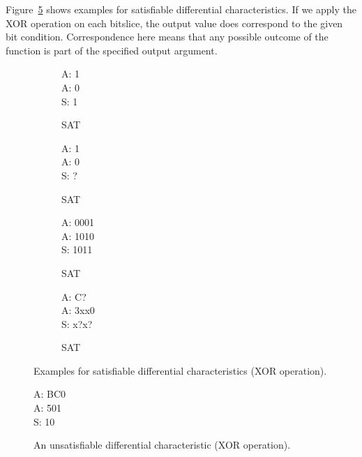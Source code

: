 Figure~\ref{dc:xor-examples} shows examples for satisfiable differential characteristics. If we apply the XOR operation on each bitslice, the output value does correspond to the given bit condition. Correspondence here means that any possible outcome of the function is part of the specified output argument.
%
\begin{figure}[b]
  \begin{center}
    \begin{subfigure}[b]{0.23\textwidth}
      \begin{diffchar}
        A: 1 \\
        A: 0 \\
        S: 1
      \end{diffchar}
      \caption{SAT}
      \label{dc:xor1}
    \end{subfigure}%
    \begin{subfigure}[b]{0.23\textwidth}
      \begin{diffchar}
        A: 1 \\
        A: 0 \\
        S: ?
      \end{diffchar}
      \caption{SAT}
      \label{dc:xor2}
    \end{subfigure}%
    \begin{subfigure}[b]{0.23\textwidth}
      \begin{diffchar}
        A: 0001 \\
        A: 1010 \\
        S: 1011
      \end{diffchar}
      \caption{SAT}
      \label{dc:xor3}
    \end{subfigure}%
    \begin{subfigure}[b]{0.23\textwidth}
      \begin{diffchar}
        A: C\textendash{}\textendash{}? \\
        A: 3xx0 \\
        S: x?x?
      \end{diffchar}
      \caption{SAT}
      \label{dc:xor4}
    \end{subfigure}
    \caption{Examples for satisfiable differential characteristics (XOR operation).}
    \label{dc:xor-examples}
  \end{center}
\end{figure}
\begin{figure}[b]
  \begin{center}
    \begin{diffchar}
      A: BC0 \\
      A: 501 \\
      S: \textendash{}10
    \end{diffchar}
    \caption{An unsatisfiable differential characteristic (XOR operation).}
    \label{dc:xor-faulty}
  \end{center}
\end{figure}

